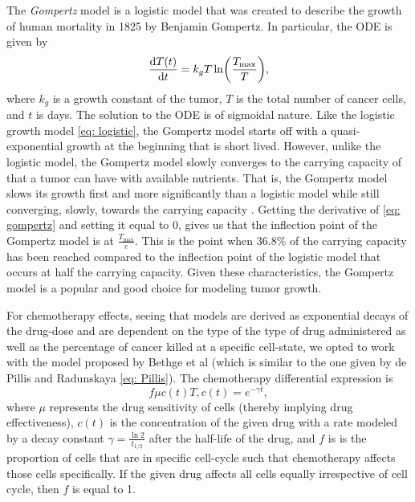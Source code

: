 \documentclass[11pt]{amsart}
\begin{document}
The \textit{Gompertz} model is a logistic model that was created to describe the growth of human mortality in 1825 by Benjamin Gompertz.
In particular, the ODE is given by
\begin{equation}
	\frac{\mathop{}\!\mathrm{d} T(t)}{\mathop{}\!\mathrm{d} t} = k_g T \ln \biggl(\frac{T_{\max}}{T} \biggr) \label{eq: gompertz},
\end{equation}
where $k_g$ is a growth constant of the tumor, $T$ is the total number of cancer cells, and $t$ is days.
The solution to the ODE is of sigmoidal nature.
Like the logistic growth model \eqref{eq: logistic}, the Gompertz model starts off with a quasi-exponential growth at the beginning that is short lived.
However, unlike the logistic model, the Gompertz model slowly converges to the carrying capacity of that a tumor can have with available nutrients.
That is, the Gompertz model slows its growth first and more significantly than a logistic model while still converging, slowly, towards the carrying capacity \cite{Steb23} .
Getting the derivative of \eqref{eq: gompertz} and setting it equal to 0, gives us that  the inflection point of the Gompertz model is at $\frac{T_{\max}}{e}$.
This is the point when 36.8\% of the carrying capacity has been reached compared to the inflection point of the logistic model that occurs at half the carrying capacity.
Given these characteristics, the Gompertz model is a popular and good choice for modeling tumor growth.

For chemotherapy effects, seeing that models are derived as exponential decays of the drug-dose and are dependent on the type of the type of drug administered as well as the percentage of cancer killed at a specific cell-state, we opted to work with the model proposed by Bethge et al (which is similar to the one given by de Pillis and Radunskaya \eqref{eq: Pillis}). The chemotherapy differential expression is 
\begin{equation}
	f \mu c(t) T, c(t) = e^{-\gamma t} \label{eq: chemo},
\end{equation}
where $\mu$ represents the drug sensitivity of cells (thereby implying drug effectiveness), $c(t)$ is the concentration of the given drug with a rate modeled by a decay constant $\gamma=\frac{\ln{2}}{t_{1/2}}$ after the half-life of the drug, and $f$ is is the proportion of cells that are in specific cell-cycle such that chemotherapy affects those cells specifically.
If the given drug affects all cells equally irrespective of cell cycle, then $f$ is equal to 1.
\end{document}
